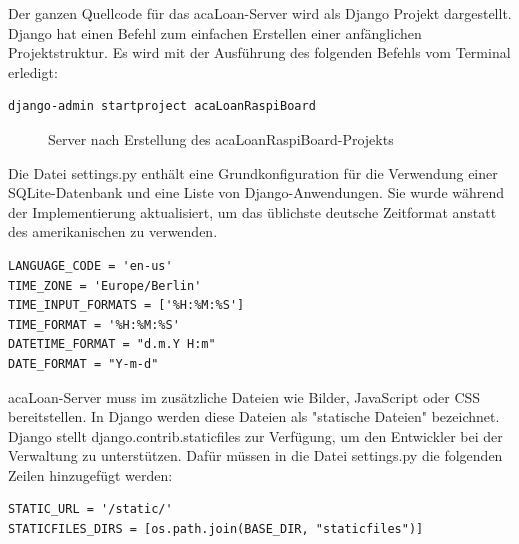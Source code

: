 Der ganzen Quellcode für das acaLoan-Server wird als Django Projekt dargestellt. Django hat einen Befehl zum einfachen Erstellen einer anfänglichen Projektstruktur. Es wird mit der Ausführung des folgenden Befehls vom Terminal erledigt:
\begin{lstlisting}[caption={[Erstellung acaLoan Django-Projekts] },captionpos=b]
 django-admin startproject acaLoanRaspiBoard   
\end{lstlisting}

\begin{figure}
	\centering
	\caption{Server nach Erstellung des acaLoanRaspiBoard-Projekts}
	\label{fig:django_start}
\end{figure}

Die Datei settings.py enthält eine Grundkonfiguration für die Verwendung einer SQLite-Datenbank und eine Liste von Django-Anwendungen. Sie wurde während der Implementierung aktualisiert, um das üblichste deutsche Zeitformat anstatt des amerikanischen zu verwenden.
\begin{lstlisting}[caption={Deutsches Zeitformat in Django},captionpos=b]
LANGUAGE_CODE = 'en-us'
TIME_ZONE = 'Europe/Berlin'
TIME_INPUT_FORMATS = ['%H:%M:%S']
TIME_FORMAT = '%H:%M:%S'
DATETIME_FORMAT = "d.m.Y H:m"
DATE_FORMAT = "Y-m-d"
\end{lstlisting}
acaLoan-Server muss im zusätzliche Dateien wie Bilder, JavaScript oder CSS bereitstellen. In Django werden diese Dateien als "statische Dateien" bezeichnet. Django stellt django.contrib.staticfiles zur Verfügung, um den Entwickler bei der Verwaltung zu unterstützen. Dafür müssen in die Datei settings.py die folgenden Zeilen hinzugefügt werden:
\begin{lstlisting}[caption={[Die zusätzliche Dateien in das Projekt hinzufügen] },captionpos=b]
STATIC_URL = '/static/'
STATICFILES_DIRS = [os.path.join(BASE_DIR, "staticfiles")]
\end{lstlisting}


